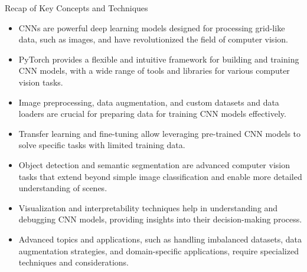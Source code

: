 \documentclass{beamer}
\begin{document}
\begin{frame}{Recap of Key Concepts and Techniques}
\begin{itemize}
    \item CNNs are powerful deep learning models designed for processing grid-like data, such as images, and have revolutionized the field of computer vision.
    \item PyTorch provides a flexible and intuitive framework for building and training CNN models, with a wide range of tools and libraries for various computer vision tasks.
    \item Image preprocessing, data augmentation, and custom datasets and data loaders are crucial for preparing data for training CNN models effectively.
    \item Transfer learning and fine-tuning allow leveraging pre-trained CNN models to solve specific tasks with limited training data.
    \item Object detection and semantic segmentation are advanced computer vision tasks that extend beyond simple image classification and enable more detailed understanding of scenes.
    \item Visualization and interpretability techniques help in understanding and debugging CNN models, providing insights into their decision-making process.
    \item Advanced topics and applications, such as handling imbalanced datasets, data augmentation strategies, and domain-specific applications, require specialized techniques and considerations.
\end{itemize}
\end{frame}
\end{document}
